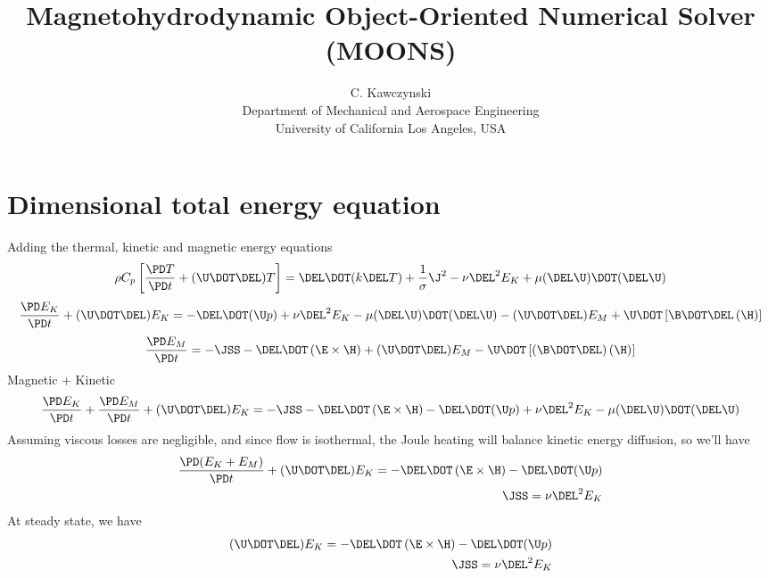 \documentclass[11pt]{article}
\begin{document}
\doublespacing
\title{Magnetohydrodynamic Object-Oriented Numerical Solver (MOONS)}
\author{C. Kawczynski \\
Department of Mechanical and Aerospace Engineering \\
University of California Los Angeles, USA\\
}
\maketitle

\section{Dimensional total energy equation}
Adding the thermal, kinetic and magnetic energy equations
\begin{equation}
	\rho C_p \left[ \frac{\PD T}{\PD t} 
	+ (\U \DOT \DEL) T \right] 
	= \DEL \DOT (k \DEL T) 
	+ \frac{1}{\sigma} \J^2 
	- \nu \DEL^2 E_K
	+ \mu (\DEL \U) \DOT (\DEL \U)
\end{equation}
\begin{equation}
	\frac{\PD E_K}{\PD t} + 
	(\U \DOT \DEL) E_K = 
	- \DEL \DOT (\U p)
	+ \nu \DEL^2 E_K
	- \mu (\DEL \U) \DOT (\DEL \U)
	- (\U \DOT \DEL) E_M
	+ \U \DOT \left[\B \DOT \DEL \left( \H \right) \right] 
\end{equation}
\begin{equation}
	\frac{\PD E_M}{\PD t} =
	- \JSS
	- \DEL \DOT \left(\E \times \H \right)
	+ (\U \DOT \DEL) E_M
	- \U \DOT \left[(\B \DOT \DEL) \left( \H \right) \right]
\end{equation}
Magnetic + Kinetic
\begin{equation}
	\frac{\PD E_K}{\PD t} 
	+ \frac{\PD E_M}{\PD t}
	+ (\U \DOT \DEL) E_K = 
	- \JSS
	- \DEL \DOT \left(\E \times \H \right)
	- \DEL \DOT (\U p)
	+ \nu \DEL^2 E_K
	- \mu (\DEL \U) \DOT (\DEL \U)
\end{equation}
Assuming viscous losses are negligible, and since flow is isothermal, the Joule heating will balance kinetic energy diffusion, so we'll have
\begin{equation}\begin{aligned}
	\frac{\PD (E_K + E_M)}{\PD t} 
	+ (\U \DOT \DEL) E_K = 
	- \DEL \DOT \left(\E \times \H \right)
	- \DEL \DOT (\U p) \\
	\JSS = \nu \DEL^2 E_K
\end{aligned}\end{equation}
At steady state, we have
\begin{equation}\begin{aligned}
	(\U \DOT \DEL) E_K = 
	- \DEL \DOT \left(\E \times \H \right)
	- \DEL \DOT (\U p) \\
	\JSS = \nu \DEL^2 E_K
\end{aligned}\end{equation}
\end{document}
